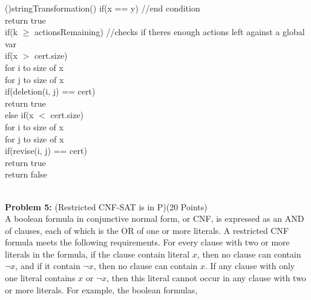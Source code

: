 \documentclass[11pt]{amsart}
\begin{document}
\begin{algorithm}[H]
    \Fn(){stringTransformation()}{
    \SetAlgoLined
    \SetNoFillComment
    if(x == y) //end condition\\
        \hspace{.5cm}return true\\
    if(k $\geq$ actionsRemaining) //checks if theres enough actions left against a global var\\
        \hspace{.5cm}if(x $>$ cert.size)\\
            \hspace{1cm}for i to size of x\\
                \hspace{1.5cm}for j to size of x\\
                    \hspace{2cm}if(deletion(i, j) == cert)\\
                        \hspace{2.5cm}return true\\
        \hspace{.5cm}else if(x $<$ cert.size)\\
            \hspace{1cm}for i to size of x\\
                \hspace{1.5cm}for j to size of x\\
                    \hspace{2cm}if(revise(i, j) == cert)\\
                        \hspace{2.5cm}return true\\
        \hspace{.5cm}return false\\
    }
\end{algorithm}

\newpage
\hrulefill \\
\textbf{Problem 5:} (Restricted CNF-SAT is in P)\hfill (20 Points)\\

A boolean formula in conjunctive normal form, or CNF, is expressed as an AND of clauses, each of which is the OR of one or more literals. A restricted CNF formula meets the following requirements. For every clause with two or more literals in the formula, if the clause contain literal $x$, then no clause can contain $\neg x$, and if it contain $\neg x$, then no clause can contain $x$. If any clause with only one literal contains $x$ or $\neg x$, then this literal cannot occur in any clause with two or more literals. For example, the boolean formulas, \\
\end{document}
